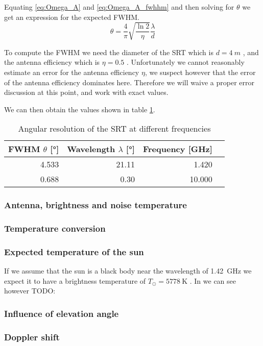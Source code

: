 Equating \eqref{eq:Omega_A} and \eqref{eq:Omega_A_fwhhm} and then solving for $\theta$ we get an expression for the expected FWHM.
\begin{equation}
    \theta = \frac{4}{\pi} \sqrt{\frac{\ln{2}}{\eta}}\frac{\lambda}{d} \label{eq:fwhm}
\end{equation}

To compute the FWHM we need the diameter of the SRT which is $d = \SI{4}{m}$ \cite[p. 4]{srt}, and the antenna efficiency which is $\eta = 0.5$ \cite[p. 2]{srt}.
Unfortunately we cannot reasonably estimate an error for the antenna efficiency $\eta$, we suspect however that the error of the antenna efficiency dominates here.
Therefore we will waive a proper error discussion at this point, and work with exact values.

We can then obtain the values shown in table \ref{tab:ang_res}.
\begin{table}[H]
    \centering
    \begin{tabular}{rrrr}
        \toprule
        FWHM $\theta$ [\si{\degree}] & Wavelength $\lambda$ [\si{\degree}] & Frequency [\si{\giga \hertz}]\\
        \midrule
        \num{4.533} & \num{21.11} & \num{1.420}\\
        \num{0.688} & \num{0.30} & \num{10.000}\\
        \bottomrule
    \end{tabular}
    \caption{Angular resolution of the SRT at different frequencies}
    \label{tab:ang_res}
\end{table}
\subsubsection{Antenna, brightness and noise temperature}

\subsubsection{Temperature conversion}

\subsubsection{Expected temperature of the sun}\label{sec:temp}
If we assume that the sun is a black body near the wavelength of \SI{1.42}{\giga\hertz} we expect it to have a brightness temperature of $T_{\odot} = \SI{5778}{\kelvin}$ \cite[p. 211]{ftb}.
In \cite[p.8-45 fig. 8-34]{kraus} we can see however TODO:

\subsubsection{Influence of elevation angle}


\subsubsection{Doppler shift}